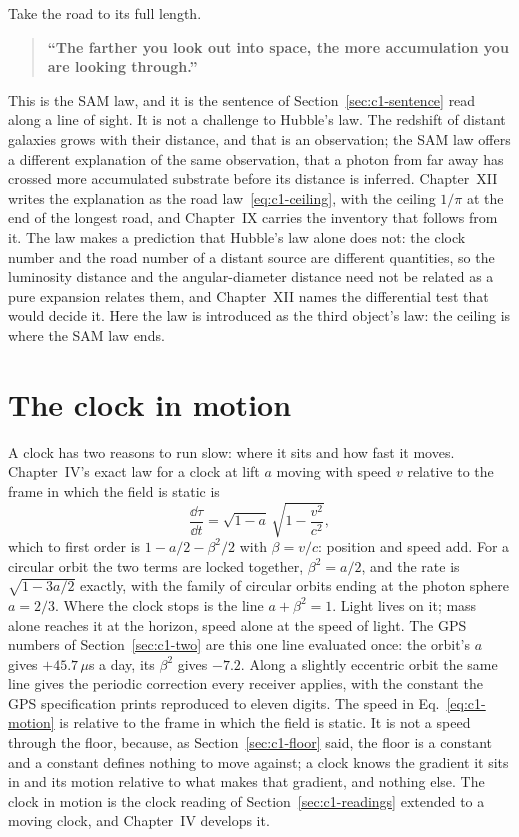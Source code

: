 Take the road to its full length.
\begin{quote}
\textbf{``The farther you look out into space, the more accumulation you are looking through.''}
\end{quote}
This is the SAM law, and it is the sentence of Section~\ref{sec:c1-sentence} read along a line of sight. It is not a challenge to Hubble's law. The redshift of distant galaxies grows with their distance, and that is an observation; the SAM law offers a different explanation of the same observation, that a photon from far away has crossed more accumulated substrate before its distance is inferred. Chapter~XII writes the explanation as the road law~\eqref{eq:c1-ceiling}, with the ceiling $1/\pi$ at the end of the longest road, and Chapter~IX carries the inventory that follows from it. The law makes a prediction that Hubble's law alone does not: the clock number and the road number of a distant source are different quantities, so the luminosity distance and the angular-diameter distance need not be related as a pure expansion relates them, and Chapter~XII names the differential test that would decide it. Here the law is introduced as the third object's law: the ceiling is where the SAM law ends.

\section{The clock in motion}
\label{sec:c1-motion}

A clock has two reasons to run slow: where it sits and how fast it moves. Chapter~IV's exact law for a clock at lift $a$ moving with speed $v$ relative to the frame in which the field is static is
\begin{equation}
\frac{\dd\tau}{\dd t}=\sqrt{1-a}\,\sqrt{1-\frac{v^2}{c^2}},
\label{eq:c1-motion}
\end{equation}
which to first order is $1-a/2-\beta^2/2$ with $\beta=v/c$: position and speed add. For a circular orbit the two terms are locked together, $\beta^2=a/2$, and the rate is $\sqrt{1-3a/2}$ exactly, with the family of circular orbits ending at the photon sphere $a=2/3$. Where the clock stops is the line $a+\beta^2=1$. Light lives on it; mass alone reaches it at the horizon, speed alone at the speed of light. The GPS numbers of Section~\ref{sec:c1-two} are this one line evaluated once: the orbit's $a$ gives $+45.7\,\mu$s a day, its $\beta^2$ gives $-7.2$. Along a slightly eccentric orbit the same line gives the periodic correction every receiver applies, with the constant the GPS specification prints reproduced to eleven digits. The speed in Eq.~\eqref{eq:c1-motion} is relative to the frame in which the field is static. It is not a speed through the floor, because, as Section~\ref{sec:c1-floor} said, the floor is a constant and a constant defines nothing to move against; a clock knows the gradient it sits in and its motion relative to what makes that gradient, and nothing else. The clock in motion is the clock reading of Section~\ref{sec:c1-readings} extended to a moving clock, and Chapter~IV develops it.

